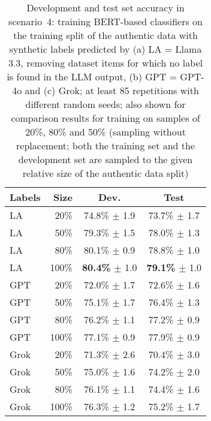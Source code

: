 
\begin{table}
\centering
\begin{tabular}{lrcc}
\textbf{Labels} & \textbf{Size}  & \textbf{Dev.} & \textbf{Test}  \\
\hline
LA  &   20\%  &   74.8\% $\pm$    1.9  &   73.7\% $\pm$    1.7  \\
LA  &   50\%  &   79.3\% $\pm$    1.5  &   78.0\% $\pm$    1.3  \\
LA  &   80\%  &   80.1\% $\pm$    0.9  &   78.8\% $\pm$    1.0  \\
LA  &   100\%  &   \textbf{80.4\%} $\pm$    1.0  &   \textbf{79.1\%} $\pm$    1.0  \\
\hline
GPT  &   20\%  &   72.0\% $\pm$    1.7  &   72.6\% $\pm$    1.6  \\
GPT  &   50\%  &   75.1\% $\pm$    1.7  &   76.4\% $\pm$    1.3  \\
GPT  &   80\%  &   76.2\% $\pm$    1.1  &   77.2\% $\pm$    0.9  \\
GPT  &   100\%  &   77.1\% $\pm$    0.9  &   77.9\% $\pm$    0.9  \\
\hline
Grok  &   20\%  &   71.3\% $\pm$    2.6  &   70.4\% $\pm$    3.0  \\
Grok  &   50\%  &   75.0\% $\pm$    1.6  &   74.2\% $\pm$    2.0  \\
Grok  &   80\%  &   76.1\% $\pm$    1.1  &   74.4\% $\pm$    1.6  \\
Grok  &   100\%  &   76.3\% $\pm$    1.2  &   75.2\% $\pm$    1.7  \\
\hline
\end{tabular}
\caption{Development and test set accuracy in scenario~4: training BERT-based classifiers on the training split of the
authentic data with synthetic labels predicted by
(a) LA = Llama 3.3, removing dataset items for which no label is found in the LLM output,
(b) GPT = GPT-4o and
(c) Grok;
at least
85 repetitions with different random seeds;
also shown for comparison results for training on samples
of 20\%, 80\% and 50\%
(sampling without replacement;
both the training set and the development set are sampled
to the given relative size of the authentic data split)
}
\label{t:results-s4-c}
\end{table}
